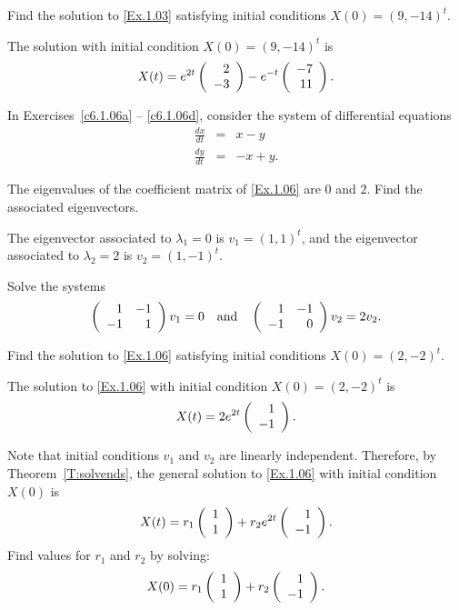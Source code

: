 \documentclass{ximera}
\begin{document}
\begin{exercise} \label{c6.1.03d}
Find the solution to \eqref{Ex.1.03} satisfying initial conditions $X(0) =
(9,-14)^t$.

\begin{solution}
The solution with initial condition  $X(0) = (9,-14)^t$ is
\[
X(t) = e^{2t}\left(\begin{array}{r} 2 \\ -3\end{array}\right) - e^{-t}\left(\begin{array}{r} -7 \\ 11\end{array}\right).
\]




\end{solution}
\end{exercise}

\noindent In Exercises~\ref{c6.1.06a} -- \ref{c6.1.06d}, consider the system of
differential equations
\begin{equation} \label{Ex.1.06}
\begin{array}{rcr}
\frac{dx}{dt}  & = & x-y \\
\frac{dy}{dt}  & = & -x+y.
\end{array}
\end{equation}
\begin{exercise} \label{c6.1.06a}
The eigenvalues of the coefficient matrix of \eqref{Ex.1.06} are $0$ and $2$.
Find the associated eigenvectors.

\begin{solution}

\ans The eigenvector associated to $\lambda_1 = 0$ is $v_1 = (1,1)^t$,
and the eigenvector associated to $\lambda_2 = 2$ is $v_2 = (1,-1)^t$.

\soln Solve the systems
\[
\left(\begin{array}{rr} 1 & -1\\ -1 &1\end{array}\right)v_1 = 0 \quad\mbox{and}\quad \left(\begin{array}{rr} 1 & -1\\ -1 &0\end{array}\right)v_2 = 2v_2.
\]

\end{solution}
\end{exercise}
\begin{exercise} \label{c6.1.06b}
Find the solution to \eqref{Ex.1.06} satisfying initial conditions
$X(0)=(2,-2)^t$.

\begin{solution}
\ans The solution to \eqref{Ex.1.06} with initial condition
$X(0) = (2,-2)^t$ is 
\[
X(t) = 2e^{2t}\left(\begin{array}{r} 1 \\ -1\end{array}\right).
\]

\soln Note that initial conditions $v_1$ and $v_2$ are linearly
independent.  Therefore, by Theorem~\ref{T:solvends}, the general solution
to \eqref{Ex.1.06} with initial condition $X(0)$ is
\[
X(t) = r_1\left(\begin{array}{r} 1 \\ 1\end{array}\right) + r_2e^{2t}\left(\begin{array}{r} 1 \\ -1\end{array}\right).
\]
Find values for $r_1$ and $r_2$ by solving:
\begin{equation} \label{c6.1.06eq}
X(0) = r_1\left(\begin{array}{r} 1 \\ 1\end{array}\right) + r_2\left(\begin{array}{r} 1 \\ -1\end{array}\right).
\end{equation}

\end{solution}
\end{exercise}
\end{document}
